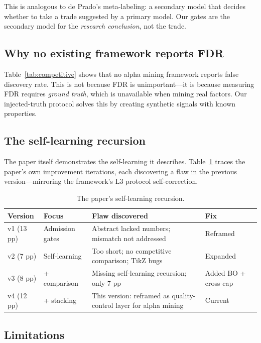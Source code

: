 \documentclass[11pt]{article}
\begin{document}
This is analogous to de Prado's meta-labeling: a secondary model that
decides whether to take a trade suggested by a primary model. Our gates are
the secondary model for the \emph{research conclusion}, not the trade.

\subsection{Why no existing framework reports FDR}

Table~\ref{tab:competitive} shows that no alpha mining framework reports
false discovery rate. This is not because FDR is unimportant---it is because
measuring FDR requires \emph{ground truth}, which is unavailable when mining
real factors. Our injected-truth protocol solves this by creating synthetic
signals with known properties.

\subsection{The self-learning recursion}

The paper itself demonstrates the self-learning it describes.
Table~\ref{tab:recursion} traces the paper's own improvement iterations,
each discovering a flaw in the previous version---mirroring the framework's
L3 protocol self-correction.

\begin{table}[htbp]
\centering
\caption{The paper's self-learning recursion.}
\label{tab:recursion}
\small
\begin{tabular}{@{}lp{3cm}p{3.5cm}p{4cm}@{}}
\toprule
Version & Focus & Flaw discovered & Fix \\
\midrule
v1 (13 pp) & Admission gates & Abstract lacked numbers; mismatch not addressed & Reframed \\
v2 (7 pp) & Self-learning & Too short; no competitive comparison; TikZ bugs & Expanded \\
v3 (8 pp) & + comparison & Missing self-learning recursion; only 7 pp & Added BO + cross-cap \\
v4 (12 pp) & + stacking & This version: reframed as quality-control layer for alpha mining & Current \\
\bottomrule
\end{tabular}
\end{table}

\subsection{Limitations}
\label{sec:limitations}
\end{document}
